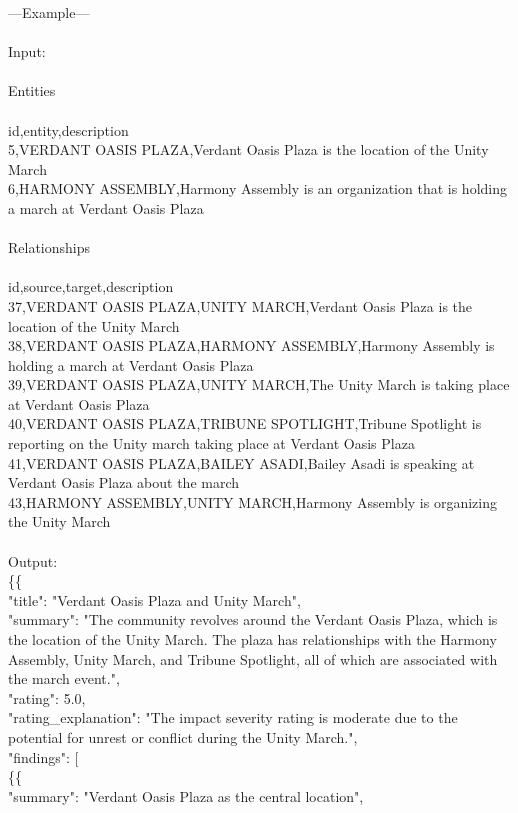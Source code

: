 \documentclass{article}
\begin{document}
{---Example---\\
\\
Input:\\
\\
Entities\\
\\
id,entity,description\\
5,VERDANT OASIS PLAZA,Verdant Oasis Plaza is the location of the Unity March\\
6,HARMONY ASSEMBLY,Harmony Assembly is an organization that is holding a march at Verdant Oasis Plaza\\
\\
Relationships\\
\\
id,source,target,description\\
37,VERDANT OASIS PLAZA,UNITY MARCH,Verdant Oasis Plaza is the location of the Unity March\\
38,VERDANT OASIS PLAZA,HARMONY ASSEMBLY,Harmony Assembly is holding a march at Verdant Oasis Plaza\\
39,VERDANT OASIS PLAZA,UNITY MARCH,The Unity March is taking place at Verdant Oasis Plaza\\
40,VERDANT OASIS PLAZA,TRIBUNE SPOTLIGHT,Tribune Spotlight is reporting on the Unity march taking place at Verdant Oasis Plaza\\
41,VERDANT OASIS PLAZA,BAILEY ASADI,Bailey Asadi is speaking at Verdant Oasis Plaza about the march\\
43,HARMONY ASSEMBLY,UNITY MARCH,Harmony Assembly is organizing the Unity March\\
\\
Output:\\
\{\{\\
    "title": "Verdant Oasis Plaza and Unity March",\\
    "summary": "The community revolves around the Verdant Oasis Plaza, which is the location of the Unity March. The plaza has relationships with the Harmony Assembly, Unity March, and Tribune Spotlight, all of which are associated with the march event.",\\
    "rating": 5.0,\\
    "rating\_explanation": "The impact severity rating is moderate due to the potential for unrest or conflict during the Unity March.",\\
    "findings": [\\
        \{\{\\
            "summary": "Verdant Oasis Plaza as the central location",\\
}
\end{document}
